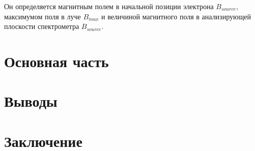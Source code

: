 \documentclass[a4paper,14pt]{extarticle}
\begin{document}
    Он определяется магнитным полем в начальной позиции электрона $B_{source}$, максимумом поля в луче $B_{max}$
    и величиной магнитного поля в анализирующей плоскости спектрометра $B_{source}$.
    
    

    
    \newpage
    \section{Основная часть}
    


    \section{Выводы}
    
    \section{Заключение}
    
    \newpage
    \newrefcontext[sorting=none]
    \printbibliography[heading=bibnumbered]
\end{document}
